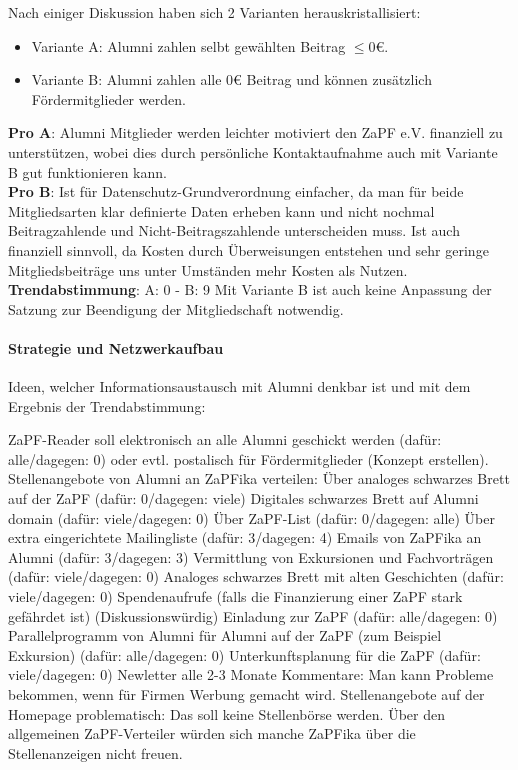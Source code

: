       Nach einiger Diskussion haben sich 2 Varianten herauskristallisiert:
      \begin{itemize}
        \item Variante A: Alumni zahlen selbt gewählten Beitrag $\leq 0 \euro$.
        \item Variante B: Alumni zahlen alle $0 \euro$ Beitrag und können zusätzlich Fördermitglieder werden.
      \end{itemize}
      \textbf{Pro A}: Alumni Mitglieder werden leichter motiviert den ZaPF e.V. finanziell zu unterstützen, wobei dies durch persönliche Kontaktaufnahme auch mit Variante B gut funktionieren kann. \\
      \textbf{Pro B}: Ist für Datenschutz-Grundverordnung einfacher, da man für beide Mitgliedsarten klar definierte Daten erheben kann und nicht nochmal Beitragzahlende und Nicht-Beitragszahlende unterscheiden muss. Ist auch finanziell sinnvoll, da Kosten durch Überweisungen entstehen und sehr geringe Mitgliedsbeiträge uns unter Umständen mehr Kosten als Nutzen. \\

      \textbf{Trendabstimmung}: A: 0 -  B: 9 
      Mit Variante B ist auch keine Anpassung der Satzung zur Beendigung der Mitgliedschaft 
notwendig. 

      \paragraph{Strategie und Netzwerkaufbau}
        Ideen, welcher Informationsaustausch mit Alumni denkbar ist und mit dem Ergebnis der Trendabstimmung:
        \begin{outline}
          \1 ZaPF-Reader soll elektronisch an alle Alumni geschickt werden (dafür: alle/dagegen: 0) oder evtl. postalisch für Fördermitglieder (Konzept erstellen).
          \1 Stellenangebote von Alumni an ZaPFika verteilen:
            \2 Über analoges schwarzes Brett auf der ZaPF (dafür: 0/dagegen: viele)
            \2 Digitales schwarzes Brett auf Alumni domain (dafür: viele/dagegen: 0)
            \2 Über ZaPF-List (dafür: 0/dagegen: alle)
            \2 Über extra eingerichtete Mailingliste (dafür: 3/dagegen: 4)
            \2 Emails von ZaPFika an Alumni (dafür: 3/dagegen: 3)
          \1 Vermittlung von Exkursionen und Fachvorträgen (dafür: viele/dagegen: 0)
          \1 Analoges schwarzes Brett mit alten Geschichten (dafür: viele/dagegen: 0)
          \1 Spendenaufrufe (falls die Finanzierung einer ZaPF stark gefährdet ist) (Diskussionswürdig)
          \1 Einladung zur ZaPF (dafür: alle/dagegen: 0)
          \1 Parallelprogramm von Alumni für Alumni auf der ZaPF (zum Beispiel Exkursion) (dafür: alle/dagegen: 0)
          \1 Unterkunftsplanung für die ZaPF (dafür: viele/dagegen: 0)
          \1 Newletter alle 2-3 Monate
          \1 Kommentare: Man kann Probleme bekommen, wenn für Firmen Werbung gemacht wird. Stellenangebote auf der Homepage problematisch: Das soll keine Stellenbörse werden. Über den allgemeinen ZaPF-Verteiler würden sich manche ZaPFika über die Stellenanzeigen nicht freuen.
        \end{outline}


